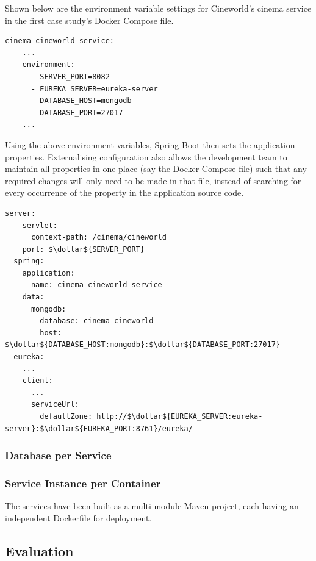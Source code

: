 Shown below are the environment variable settings for Cineworld's cinema service in the first case study's Docker Compose file.
\begin{lstlisting}[caption=Snippet from \code{docker-compose.yml}]
  cinema-cineworld-service:
    ...
    environment:
      - SERVER_PORT=8082
      - EUREKA_SERVER=eureka-server
      - DATABASE_HOST=mongodb
      - DATABASE_PORT=27017
    ...
\end{lstlisting}

Using the above environment variables, Spring Boot then sets the application properties. Externalising configuration also allows the development team to maintain all properties in one place (say the Docker Compose file) such that any required changes will only need to be made in that file, instead of searching for every occurrence of the property in the application source code.

\begin{lstlisting}[caption=Snippet from \code{cinema-cineworld-service} \code{application.yml} file]
  server:
    servlet:
      context-path: /cinema/cineworld
    port: $\dollar${SERVER_PORT}
  spring:
    application:
      name: cinema-cineworld-service
    data:
      mongodb:
        database: cinema-cineworld
        host: $\dollar${DATABASE_HOST:mongodb}:$\dollar${DATABASE_PORT:27017}
  eureka:
    ...
    client:
      ...
      serviceUrl:
        defaultZone: http://$\dollar${EUREKA_SERVER:eureka-server}:$\dollar${EUREKA_PORT:8761}/eureka/
\end{lstlisting}

\subsubsection{Database per Service}

\subsubsection{Service Instance per Container}

The services have been built as a multi-module Maven project, each having an independent Dockerfile for deployment.


\subsection{Evaluation}
